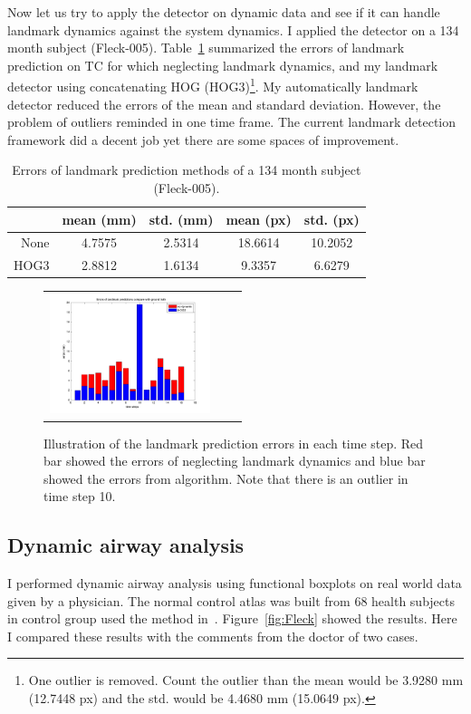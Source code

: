 Now let us try to apply the detector on dynamic data and see if it can handle landmark dynamics against the system dynamics.
I applied the detector on a 134 month subject (Fleck-005).
Table~\ref{tab:landmarks} summarized the errors of landmark prediction on TC for which neglecting landmark dynamics, and my landmark detector using concatenating HOG (HOG3)\footnote{One outlier is removed. Count the outlier than the mean would be 3.9280 mm (12.7448 px) and the std. would be 4.4680 mm (15.0649 px).}.
My automatically landmark detector reduced the errors of the mean and standard deviation.
However, the problem of outliers reminded in one time frame.
The current landmark detection framework did a decent job yet there are some spaces of improvement.

\begin{table}
  \centering
   \caption{Errors of landmark prediction methods of a 134 month subject (Fleck-005).
   }
  \begin{tabular}{rcccc}
  & mean (mm) & std. (mm) & mean (px) & std. (px) \\
  \hline
  None & 4.7575 & 2.5314 & 18.6614 & 10.2052 \\
  HOG3 & 2.8812 & 1.6134 & 9.3357 & 6.6279 \\
  \end{tabular}
  \label{tab:landmarks}
\end{table}

\begin{figure}[tb]
  \begin{center}
    \begin{tabular}{ccc}
    \includegraphics[height=35mm] {fig/landmark_errors.png}
    \end{tabular}
    \caption{ \label{fig:landmark_errors} Illustration of the landmark prediction errors in each time step. Red bar showed the errors of neglecting landmark dynamics and blue bar showed the errors from algorithm. Note that there is an outlier in time step 10.
    }
  \end{center}
\end{figure}

\subsection{Dynamic airway analysis}
\label{sec:dynamic_airway_analysis}
I performed dynamic airway analysis using functional boxplots on real world data given by a physician.
The normal control atlas was built from 68 health subjects in control group used the method in~\cite{hong2014statistical}.
Figure~\ref{fig:Fleck} showed the results.
Here I compared these results with the comments from the doctor of two cases.

